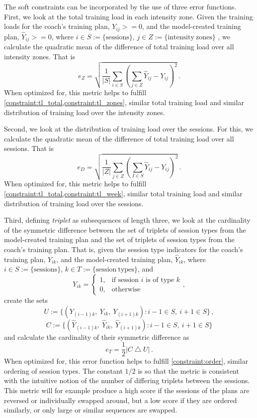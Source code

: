 The soft constraints can be incorporated by the use of three error functions.
First, we look at the total training load in each intensity zone.
Given the training loads for the coach's training plan, $Y_{ij}>=0$, and the model-created training plan, $\hat{Y}_{ij}>=0$, where $i \in S := \{\mathrm{sessions}\}$, $j \in Z := \{\mathrm{intensity\ zones}\}$ , we calculate the quadratic mean of the difference of total training load over all intensity zones. That is 
\begin{equation}
    e_{Z} = \sqrt{\frac{1}{|S|}\sum_{i \in S}\left(\sum_{j \in Z}\hat{Y}_{ij}-Y_{ij}\right)^2}\,.
\end{equation}
When optimized for, this metric helps to fulfill \cref{constraint:tl_total,constraint:tl_zones}, similar total training load and similar distribution of training load over the intensity zones.

Second, we look at the distribution of training load over the sessions.
For this, we calculate the quadratic mean of the difference of total training load over all sessions. That is 
\begin{equation}
    e_{D} = \sqrt{\frac{1}{|Z|}\sum_{j \in Z}\left(\sum_{I \in S}\hat{Y}_{ij}-Y_{ij}\right)^2}\,.
\end{equation}
When optimized for, this metric helps to fulfill \cref{constraint:tl_total,constraint:tl_week}, similar total training load and similar distribution of training load over the sessions.

Third, defining \textit{triplet} as subsequences of length three, we look at the cardinality of the symmetric difference between the set of triplets of session types from the model-created training plan and the set of triplets of session types from the coach's training plan.
That is, given the session type indicators for the coach's training plan, $Y_{ik}$, and the model-created training plan, $\hat{Y}_{ik}$, where $i \in S := \{\mathrm{sessions}\}$, $k \in T := \{\mathrm{session\ types}\}$, and 
\begin{equation*}
    Y_{ik} = \begin{cases}
    1, & \text{if session $i$ is of type $k$}   \\
    0, & \text{otherwise}
    \end{cases},
\end{equation*} 
create the sets
$$U:=\{(Y_{(i-1)k},\ Y_{ik},\ Y_{(i+1)k}) : i-1\in S,\ i+1\in S \}\,,$$
$$C:=\{(\hat{Y}_{(i-1)k},\ \hat{Y}_{ik},\ \hat{Y}_{(i+1)k}) : i-1\in S,\ i+1\in S \}$$
and calculate the cardinality of their symmetric difference as
\begin{equation}
    e_T = \frac{1}{2}|C\bigtriangleup U|\,.
\end{equation}
When optimized for, this error function helps to fulfill \cref{constraint:order}, similar ordering of session types.
The constant $1/2$ is so that the metric is consistent with the intuitive notion of the number of differing triplets between the sessions.
This metric will for example produce a high score if the sessions of the plans are reversed or individually swapped around, but a low score if they are ordered similarly, or only large or similar sequences are swapped.

